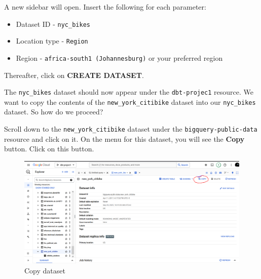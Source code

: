 \documentclass[
]{book}
\begin{document}
A new sidebar will open. Insert the following for each parameter:

\begin{itemize}
\item
  Dataset ID - \texttt{nyc\_bikes}
\item
  Location type - \texttt{Region}
\item
  Region - \texttt{africa-south1\ (Johannesburg)} or your preferred region
\end{itemize}

Thereafter, click on \textbf{CREATE DATASET}.

The \texttt{nyc\_bikes} dataset should now appear under the \texttt{dbt-projec1} resource. We want to copy the contents of the \texttt{new\_york\_citibike} dataset into our \texttt{nyc\_bikes} dataset. So how do we proceed?

Scroll down to the \texttt{new\_york\_citibike} dataset under the \texttt{bigquery-public-data} resource and click on it. On the menu for this dataset, you will see the \textbf{Copy} button. Click on this button.

\begin{figure}
\centering
\includegraphics{./images/copy.png}
\caption{Copy dataset}
\end{figure}
\end{document}
